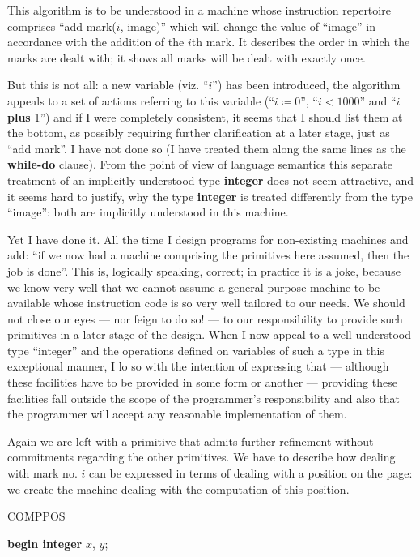 \noindent
This algorithm is to be understood in a machine whose instruction repertoire comprises ``add mark($i$, image)'' which will change the value of ``image'' in accordance with the addition of the $i$th mark. It describes the order in which the marks are dealt with; it shows all marks will be dealt with exactly once.

But this is not all: a new variable (viz. ``$i$'') has been introduced, the algorithm appeals to a set of actions referring to this variable (``$i \coloneq 0$'', \mbox{``$i < 1000$''} and ``$i$ \textbf{plus} 1'') and if I were completely consistent, it seems that I should list them at the bottom, as possibly requiring further clarification at a later stage, just as ``add mark''. I have not done so (I have treated them along the same lines as the \textbf{while-do} clause). From the point of view of language semantics this separate treatment of an implicitly understood type \textbf{integer} does not seem attractive, and it seems hard to justify, why the type \textbf{integer} is treated differently from the type ``image'': both are implicitly understood in this machine.

Yet I have done it. All the time I design programs for non-existing machines and add: ``if we now had a machine comprising the primitives here assumed, then the job is done''. This is, logically speaking, correct; in practice it is a joke, because we know very well that we cannot assume a general purpose machine to be available whose instruction code is so very well tailored to our needs. We should not close our eyes --- nor feign to do so! --- to our responsibility to provide such primitives in a later stage of the design. When I now appeal to a well-understood type ``integer'' and the operations defined on variables of such a type in this exceptional manner, I lo so with the intention of expressing that --- although these facilities have to be provided in some form or another --- providing these facilities fall outside the scope of the programmer's responsibility and also that the programmer will accept any reasonable implementation of them.

Again we are left with a primitive that admits further refinement without commitments regarding the other primitives. We have to describe how dealing with mark no. $i$ can be expressed in terms of dealing with a position on the page: we create the machine dealing with the computation of this position.

COMPPOS
\nopagebreak

\textbf{begin integer} $x$, $y$;
\nopagebreak


